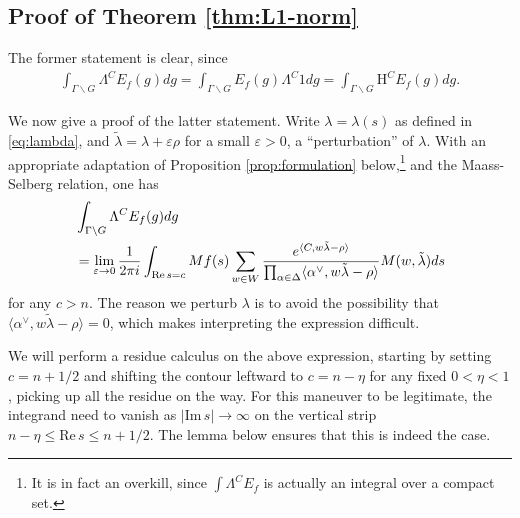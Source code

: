 \documentclass[11pt]{amsart}
\numberwithin{theorem}{section}
\numberwithin{equation}{section}
\theoremstyle{remark}
\theoremstyle{definition}
\newcommand{\re}{\mathrm{Re}\,}
\newcommand{\im}{\mathrm{Im}\,}
\newcommand{\G}{\Gamma}
\begin{document}
\subsection{Proof of Theorem \ref{thm:L1-norm}}

The former statement is clear, since
\begin{align*}
\int_{\Gamma\backslash G} \Lambda^C E_f(g)dg = \int_{\Gamma\backslash G} E_f(g) \Lambda^C1dg = \int_{\Gamma\backslash G} \mathrm H^C E_f(g)dg.
\end{align*}

We now give a proof of the latter statement.
Write $\lambda = \lambda(s)$ as defined in \eqref{eq:lambda}, and $\tilde\lambda = \lambda + \varepsilon\rho$ for a small $\varepsilon > 0$, a ``perturbation'' of $\lambda$. With an appropriate adaptation of Proposition \ref{prop:formulation} below,\footnote{It is in fact an overkill, since $\int \Lambda^CE_f$ is actually an integral over a compact set.} and the Maass-Selberg relation, one has
\begin{align}
&\int_{\G\backslash G} \Lambda^CE_f(g)dg \label{eq:L1goal} \\
&= \lim_{\varepsilon\rightarrow0} \frac{1}{2\pi i}\int_{\re s = c} Mf(s)\sum_{w \in W} \frac{e^{\langle C, w\tilde\lambda-\rho\rangle}}{\prod_{\alpha \in \Delta} \langle\alpha^\vee,w\tilde\lambda-\rho\rangle}M(w,\tilde\lambda)ds \notag
\end{align}
for any $c>n$. 
The reason we perturb $\lambda$ is to avoid the possibility that $\langle\alpha^\vee,w\tilde\lambda-\rho\rangle=0$, which makes interpreting the expression difficult.

We will perform a residue calculus on the above expression, starting by setting $c=n+1/2$ and shifting the contour leftward to $c=n-\eta$ for any fixed $0 < \eta < 1$, picking up all the residue on the way. For this maneuver to be legitimate, the integrand need to vanish as $|\im s| \rightarrow \infty$ on the vertical strip $n-\eta \leq \re s \leq n+1/2$. The lemma below ensures that this is indeed the case.
\end{document}

